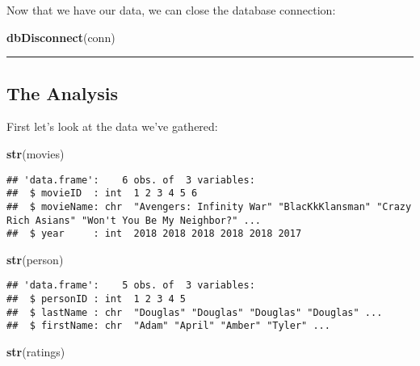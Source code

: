 \documentclass[]{article}
\newenvironment{Shaded}{\begin{snugshade}}{\end{snugshade}}
\newcommand{\KeywordTok}[1]{\textcolor[rgb]{0.13,0.29,0.53}{\textbf{#1}}}
\newcommand{\NormalTok}[1]{#1}
\begin{document}
Now that we have our data, we can close the database connection:

\begin{Shaded}
\begin{Highlighting}[]
\KeywordTok{dbDisconnect}\NormalTok{(conn)}
\end{Highlighting}
\end{Shaded}

\begin{center}\rule{0.5\linewidth}{\linethickness}\end{center}

\subsection{The Analysis}\label{the-analysis}

First let's look at the data we've gathered:

\begin{Shaded}
\begin{Highlighting}[]
\KeywordTok{str}\NormalTok{(movies)}
\end{Highlighting}
\end{Shaded}

\begin{verbatim}
## 'data.frame':    6 obs. of  3 variables:
##  $ movieID  : int  1 2 3 4 5 6
##  $ movieName: chr  "Avengers: Infinity War" "BlacKkKlansman" "Crazy Rich Asians" "Won't You Be My Neighbor?" ...
##  $ year     : int  2018 2018 2018 2018 2018 2017
\end{verbatim}

\begin{Shaded}
\begin{Highlighting}[]
\KeywordTok{str}\NormalTok{(person)}
\end{Highlighting}
\end{Shaded}

\begin{verbatim}
## 'data.frame':    5 obs. of  3 variables:
##  $ personID : int  1 2 3 4 5
##  $ lastName : chr  "Douglas" "Douglas" "Douglas" "Douglas" ...
##  $ firstName: chr  "Adam" "April" "Amber" "Tyler" ...
\end{verbatim}

\begin{Shaded}
\begin{Highlighting}[]
\KeywordTok{str}\NormalTok{(ratings)}
\end{Highlighting}
\end{Shaded}
\end{document}
